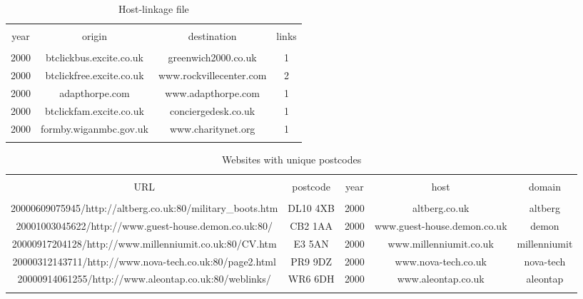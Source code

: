 \documentclass[
]{article}
\begin{document}
\begin{table}[!htbp] \centering 
  \caption{Host-linkage file\label{host_link}} 
  \label{} 
\footnotesize 
\begin{tabular}{@{\extracolsep{0pt}} cccc} 
\\[-1.8ex]\hline 
\hline \\[-1.8ex] 
year & origin & destination & links \\ 
\hline \\[-1.8ex] 
2000 & btclickbus.excite.co.uk & greenwich2000.co.uk & 1 \\ 
2000 & btclickfree.excite.co.uk & www.rockvillecenter.com & 2 \\ 
2000 & adapthorpe.com & www.adapthorpe.com & 1 \\ 
2000 & btclickfam.excite.co.uk & conciergedesk.co.uk & 1 \\ 
2000 & formby.wiganmbc.gov.uk & www.charitynet.org & 1 \\ 
\hline \\[-1.8ex] 
\end{tabular} 
\end{table}

\begin{table}[!htbp] \centering 
  \caption{Websites with unique postcodes\label{unique}} 
  \label{} 
\footnotesize 
\begin{tabular}{@{\extracolsep{0pt}} ccccc} 
\\[-1.8ex]\hline 
\hline \\[-1.8ex] 
URL & postcode & year & host & domain \\ 
\hline \\[-1.8ex] 
20000609075945/http://altberg.co.uk:80/military\_boots.htm & DL10 4XB & 2000 & altberg.co.uk & altberg \\ 
20001003045622/http://www.guest-house.demon.co.uk:80/ & CB2 1AA & 2000 & www.guest-house.demon.co.uk & demon \\ 
20000917204128/http://www.millenniumit.co.uk:80/CV.htm & E3 5AN & 2000 & www.millenniumit.co.uk & millenniumit \\ 
20000312143711/http://www.nova-tech.co.uk:80/page2.html & PR9 9DZ & 2000 & www.nova-tech.co.uk & nova-tech \\ 
20000914061255/http://www.aleontap.co.uk:80/weblinks/ & WR6 6DH & 2000 & www.aleontap.co.uk & aleontap \\ 
\hline \\[-1.8ex] 
\end{tabular} 
\end{table}
\end{document}

